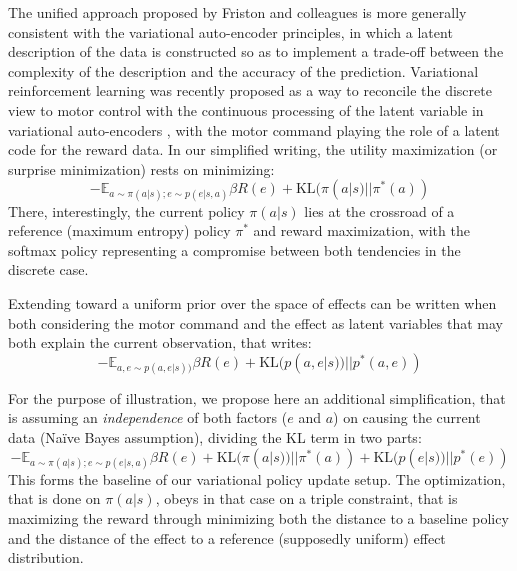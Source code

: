 \documentclass[runningheads]{llncs}
\begin{document}
The unified approach proposed by Friston and colleagues is more generally consistent with the variational auto-encoder principles, in which a latent description of the data is constructed so as to implement a trade-off between the complexity of the description and the accuracy of the prediction. Variational reinforcement learning was recently proposed as a way to reconcile the discrete view to motor control with the continuous processing of the latent variable in variational auto-encoders \cite{levine2013guided,fox2015taming,haarnoja2017reinforcement}, with the motor command playing the role of a latent code for the reward data.  In our simplified writing, the utility maximization (or surprise minimization) rests on minimizing:
\begin{equation}
-\mathbb{E}_{a\sim \pi(a|s); e\sim p(e|s,a)} \beta R(e) + \text{KL}(\pi(a|s)||\pi^*(a)) 
\end{equation}
There, interestingly, the current policy $\pi(a|s)$ lies at the crossroad of a reference (maximum entropy) policy $\pi^*$ and reward maximization, with the softmax policy representing a compromise between both tendencies in the discrete case. 

Extending toward a uniform prior over the space of effects can be written when both considering the motor command and the effect as latent variables that may both explain the current observation, that writes:
\begin{equation}
-\mathbb{E}_{a, e\sim p(a,e|s))} \beta R(e) + \text{KL}(p(a,e|s))||p^*(a,e)) 
\end{equation}   

For the purpose of illustration, we propose here an additional simplification, that is assuming an \emph{independence} of both factors ($e$ and $a$) on causing the current data (Naïve Bayes assumption), dividing the KL term in two parts:
\begin{equation}
-\mathbb{E}_{a\sim \pi(a|s); e\sim p(e|s,a)} \beta R(e) + \text{KL}(\pi(a|s))||\pi^*(a)) + \text{KL}(p(e|s))||p^*(e))
\end{equation}   
This forms the baseline of our variational policy update setup. The optimization, that is done on $\pi(a|s)$, obeys in that case on a triple constraint, that is maximizing the reward through minimizing both the distance to a baseline policy and the distance of the effect to a reference (supposedly uniform) effect distribution.
\end{document}
